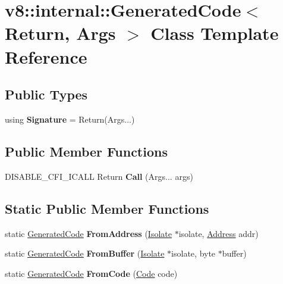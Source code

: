 \hypertarget{classv8_1_1internal_1_1GeneratedCode}{}\section{v8\+:\+:internal\+:\+:Generated\+Code$<$ Return, Args $>$ Class Template Reference}
\label{classv8_1_1internal_1_1GeneratedCode}
\subsection*{Public Types}
\begin{DoxyCompactItemize}
\item 
\mbox{\label{classv8_1_1internal_1_1GeneratedCode_af4942e5ffb7b48656e55c1dbf7f4e6bb}} 
using {\bfseries Signature} = Return(Args...)
\end{DoxyCompactItemize}
\subsection*{Public Member Functions}
\begin{DoxyCompactItemize}
\item 
\mbox{\label{classv8_1_1internal_1_1GeneratedCode_a8d5d254677c1bd16fa2948ca57f92a4b}} 
D\+I\+S\+A\+B\+L\+E\+\_\+\+C\+F\+I\+\_\+\+I\+C\+A\+LL Return {\bfseries Call} (Args... args)
\end{DoxyCompactItemize}
\subsection*{Static Public Member Functions}
\begin{DoxyCompactItemize}
\item 
\mbox{\label{classv8_1_1internal_1_1GeneratedCode_a07a642c1a66920f5fa6e39be1d5542d1}} 
static \mbox{\hyperlink{classv8_1_1internal_1_1GeneratedCode}{Generated\+Code}} {\bfseries From\+Address} (\mbox{\hyperlink{classv8_1_1internal_1_1Isolate}{Isolate}} $\ast$isolate, \mbox{\hyperlink{classuintptr__t}{Address}} addr)
\item 
\mbox{\label{classv8_1_1internal_1_1GeneratedCode_a75351fd77b0be30d382b2a50d980e2a5}} 
static \mbox{\hyperlink{classv8_1_1internal_1_1GeneratedCode}{Generated\+Code}} {\bfseries From\+Buffer} (\mbox{\hyperlink{classv8_1_1internal_1_1Isolate}{Isolate}} $\ast$isolate, byte $\ast$buffer)
\item 
\mbox{\label{classv8_1_1internal_1_1GeneratedCode_a68e5a41c6dfdf196afab5f7868ae2243}} 
static \mbox{\hyperlink{classv8_1_1internal_1_1GeneratedCode}{Generated\+Code}} {\bfseries From\+Code} (\mbox{\hyperlink{classv8_1_1internal_1_1Code}{Code}} code)
\end{DoxyCompactItemize}

